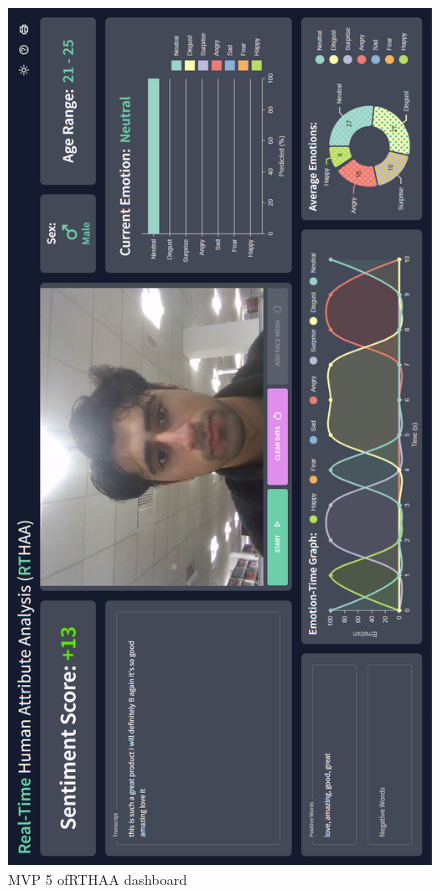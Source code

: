 \documentclass[12pt, a4paper]{article}
\begin{document}
\begin{appendices}
\begin{figure}[H]
    \centering
    \includegraphics[scale=0.58]{images/webappFE10.png}
    \caption{MVP 5 ofRTHAA dashboard}
    \label{fig:wa7}
\end{figure}


\end{appendices}
\end{document}
